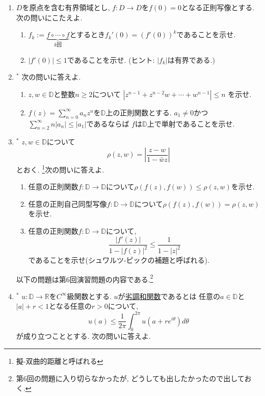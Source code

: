 \documentclass[dvipdfmx,a4paper,11pt]{article}
\newcommand{\R}{\mathbb{R}}
\newcommand{\D}{\mathbb{D}}
\theoremstyle{definition}
\begin{document}
\begin{enumerate}[label=\textbf{問}7.\arabic*]
  
\item $D$を原点を含む有界領域とし, $f : D \rightarrow D$を$f(0)=0$となる正則写像とする.次の問いにこたえよ.
     \begin{enumerate}
\setlength{\parskip}{0cm} 
  \setlength{\itemsep}{0cm} 
  \item $f_k:=\underbrace{f \circ \cdots \circ f}_{\text{$k$回}}$とするとき$f_{k}' (0) = (f'(0))^k$であることを示せ. 
  \item $|f'(0)| \le 1$であることを示せ.  (ヒント: $|f_k|$は有界である.)
    \end{enumerate} 
  \item $^{*}$ 次の問いに答えよ.
   \begin{enumerate}
\setlength{\parskip}{0cm} 
  \setlength{\itemsep}{0cm} 
  \item $z,w \in \D $と整数$ n \ge 2$について
  $
  |z^{n-1}+ z^{n-2}w + \cdots +w^{n-1}| \le n
  $
を示せ.
  \item $f(z) = \sum_{n=0}^{\infty}a_n z^n$を$\D$上の正則関数とする. 
  $a_1 \neq 0$かつ$\sum_{n=2}^{\infty}n|a_n| \le |a_1|$であるならば
  $f $は$\D$上で単射であることを示せ.
    \end{enumerate} 
  


   \item $^{*}$ $z, w \in \D$について
   $$
   \rho (z,w)= \left|\frac{z-w}{1 - \bar{w}z}\right|
   $$
   とおく. \footnote{擬-双曲的距離と呼ばれる}次の問いに答えよ. 
   \begin{enumerate}
\setlength{\parskip}{0cm} 
  \setlength{\itemsep}{0cm} 
  \item 任意の正則関数$f : \D \to \D$について$\rho(f(z), f(w)) \le \rho(z, w)$を示せ.
  \item 任意の正則自己同型写像$f : \D \to \D$について$\rho(f(z), f(w)) = \rho(z, w)$を示せ. 
   \item 任意の正則関数$f : \D \to \D$について,
   $$
   \frac{|f'(z)|}{1 - |f(z)|^2} \le    \frac{1}{1 - |z|^2} 
   $$
   であることを示せ(シュワルツ-ピックの補題と呼ばれる).
           \end{enumerate} 

\hspace{-12pt}
以下の問題は第6回演習問題の内容である.\footnote{第6回の問題に入り切らなかったが, どうしても出したかったので出しておく.}
 \item $^{*}$  $u : \D \rightarrow \R$を$C^{\infty}$級関数とする. $u$が\underline{劣調和関数}であるとは
 任意の$a \in \D$と$|a|+r <1$となる任意の$r>0$について, 
 $$
 u(a) \le \frac{1}{2 \pi} \int_{0}^{2 \pi}  u(a +  re^{i \theta})  d \theta
 $$
 が成り立つこととする. 次の問いに答えよ. 


\end{enumerate}
\end{document}
